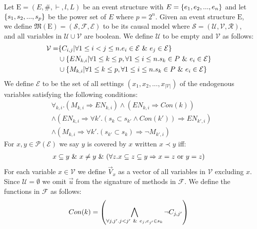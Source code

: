 Let $\mathrm{E} = (E,\#,\vdash,l,L)$ be an event structure with
$E = \{e_1, e_2, ...,e_n\}$ and let $\{s_1,s_2,...,s_p\}$ be the power set of $E$ where $p = 2^n$.
Given an event structure $\mathrm{E}$, we define
$\mathfrak{M}(\mathrm{E}) = (\mathcal{S},\mathcal{F},\mathcal{E})$
to be its causal model where 
$\mathcal{S} = (\mathcal{U},\mathcal{V},\mathcal{R})$, and all variables in
$\mathcal{U} \cup \mathcal{V}$ are boolean.
We define $\mathcal{U}$ to be empty and $\mathcal{V}$ as follows:
\begin{align*}
    \mathcal{V} = & \{C_{i,j} | \forall 1 \leq i < j \leq n. e_i \in \mathcal{E} \ \& \  e_j \in \mathcal{E}\}                    \\
                  & \cup \{EN_{k,i} | \forall 1 \leq k \leq p , \forall 1 \leq i \leq n . s_k \in P \ \& \  e_i \in \mathcal{E} \} \\
                  & \cup \{M_{k,i} | \forall 1 \leq k \leq p , \forall 1 \leq i \leq n . s_k \in P \ \& \  e_i \in \mathcal{E} \} \\
\end{align*}
We define $\mathcal{E}$ to be the set of all settings
$(x_1,x_2,...,x_{|\mathcal{V}|})$ of the endogenous variables satisfying
the following conditions:
\begin{align*}
     & \forall_{k,i}.
    \left(
    M_{k,i} \Rightarrow EN_{k,i}
    \right)
    \wedge
    \left(
    EN_{k,i} \Rightarrow Con(k)
    \right)
    \\
     & \wedge \left(EN_{k,i} \Rightarrow
    \forall k'. (s_k \subset s_{k'} \wedge Con(k')) \Rightarrow EN_{k',i}
    \right)                             \\
     & \wedge \left(
    M_{k,i} \Rightarrow \forall k'.
    (s_{k'} \subset s_k) \Rightarrow \neg M_{k',i}
    \right)
\end{align*}
For $x,y \in \mathcal{P}(\mathcal{E})$ we say $y$ is covered by $x$ written $ x \prec y$ iff:
\begin{align*}
    x \subseteq y \ \& \  x \neq y \ \& \ 
    (\forall z. x \subseteq z \subseteq y \Rightarrow x = z
    \text{ or } y = z)
\end{align*}
For each variable $x \in \mathcal{V}$ we define $\vec V_x$ as a vector
of all variables in $\mathcal{V}$ excluding $x$.
Since $\mathcal{U} = \emptyset$ we omit $\vec u$ from the
signature of methods in $\mathcal{F}$.
We define the functions in $\mathcal{F}$ as follows:
\begin{align*}
    Con(k) & =   \left(
    \bigwedge_{\forall j,j'. j<j' \ \& \  e_j,e_{j'} \in s_k}
    \neg C_{j,j'}
    \right)             \\
\end{align*}
